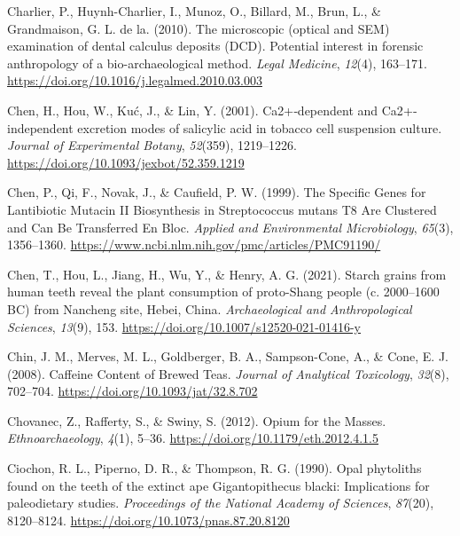 \documentclass[
  letterpaper,
]{book}
\newlength{\cslhangindent}
\newlength{\cslentryspacingunit} %
\newenvironment{CSLReferences}[2] %
 {%
  \setlength{\parindent}{0pt}
  \ifodd #1
  \let\oldpar\par
  \def\par{\hangindent=\cslhangindent\oldpar}
  \fi
  \setlength{\parskip}{#2\cslentryspacingunit}
 }%
 {}
\begin{document}
\begin{CSLReferences}{1}{0}
\leavevmode{}%
Charlier, P., Huynh-Charlier, I., Munoz, O., Billard, M., Brun, L., \&
Grandmaison, G. L. de la. (2010). The microscopic (optical and {SEM})
examination of dental calculus deposits ({DCD}). {Potential} interest in
forensic anthropology of a bio-archaeological method. \emph{Legal
Medicine}, \emph{12}(4), 163--171.
\url{https://doi.org/10.1016/j.legalmed.2010.03.003}

\leavevmode{}%
Chen, H., Hou, W., Kuć, J., \& Lin, Y. (2001). Ca2+‐dependent and
{Ca2}+‐independent excretion modes of salicylic acid in tobacco cell
suspension culture. \emph{Journal of Experimental Botany},
\emph{52}(359), 1219--1226.
\url{https://doi.org/10.1093/jexbot/52.359.1219}

\leavevmode{}%
Chen, P., Qi, F., Novak, J., \& Caufield, P. W. (1999). The {Specific
Genes} for {Lantibiotic Mutacin II Biosynthesis} in {Streptococcus}
mutans {T8 Are Clustered} and {Can Be} {Transferred En Bloc}.
\emph{Applied and Environmental Microbiology}, \emph{65}(3), 1356--1360.
\url{https://www.ncbi.nlm.nih.gov/pmc/articles/PMC91190/}

\leavevmode{}%
Chen, T., Hou, L., Jiang, H., Wu, Y., \& Henry, A. G. (2021). Starch
grains from human teeth reveal the plant consumption of proto-{Shang}
people (c. 2000--1600 {BC}) from {Nancheng} site, {Hebei}, {China}.
\emph{Archaeological and Anthropological Sciences}, \emph{13}(9), 153.
\url{https://doi.org/10.1007/s12520-021-01416-y}

\leavevmode{}%
Chin, J. M., Merves, M. L., Goldberger, B. A., Sampson-Cone, A., \&
Cone, E. J. (2008). Caffeine {Content} of {Brewed Teas}. \emph{Journal
of Analytical Toxicology}, \emph{32}(8), 702--704.
\url{https://doi.org/10.1093/jat/32.8.702}

\leavevmode{}%
Chovanec, Z., Rafferty, S., \& Swiny, S. (2012). Opium for the {Masses}.
\emph{Ethnoarchaeology}, \emph{4}(1), 5--36.
\url{https://doi.org/10.1179/eth.2012.4.1.5}

\leavevmode{}%
Ciochon, R. L., Piperno, D. R., \& Thompson, R. G. (1990). Opal
phytoliths found on the teeth of the extinct ape {Gigantopithecus}
blacki: Implications for paleodietary studies. \emph{Proceedings of the
National Academy of Sciences}, \emph{87}(20), 8120--8124.
\url{https://doi.org/10.1073/pnas.87.20.8120}


\end{CSLReferences}
\end{document}
